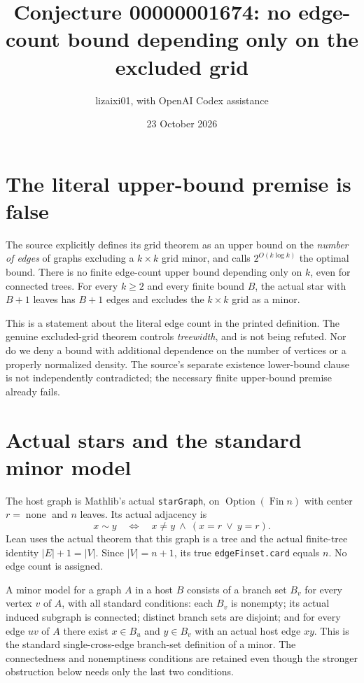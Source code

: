 \documentclass[11pt]{article}
\title{Conjecture 00000001674: no edge-count bound depending only on the excluded grid}
\author{lizaixi01, with OpenAI Codex assistance}
\date{23 October 2026}
\begin{document}
\maketitle
\section{The literal upper-bound premise is false}
The source explicitly defines its grid theorem as an upper bound
on the \emph{number of edges} of graphs excluding a $k\times k$
grid minor, and calls $2^{O(k\log k)}$ the optimal bound.
There is no finite edge-count upper bound depending only on $k$,
even for connected trees. For every $k\geq2$ and every finite
bound $B$, the actual star with $B+1$ leaves has $B+1$ edges
and excludes the $k\times k$ grid as a minor.

This is a statement about the literal edge count in the printed
definition. The genuine excluded-grid theorem controls
\emph{treewidth}, and is not being refuted. Nor do we deny a
bound with additional dependence on the number of vertices or a
properly normalized density. The source's separate existence
lower-bound clause is not independently contradicted; the
necessary finite upper-bound premise already fails.

\section{Actual stars and the standard minor model}
The host graph is Mathlib's actual \texttt{starGraph}, on
$\operatorname{Option}(\operatorname{Fin}n)$ with center
$r=\operatorname{none}$ and $n$ leaves. Its actual adjacency is
\[
 x\sim y\quad\Longleftrightarrow\quad
 x\ne y\ \land\ (x=r\ \lor\ y=r).
\]
Lean uses the actual theorem that this graph is a tree and the
actual finite-tree identity
$|E|+1=|V|$. Since $|V|=n+1$, its true
\texttt{edgeFinset.card} equals $n$. No edge count is assigned.

A minor model for a graph $A$ in a host $B$ consists of a branch
set $B_v$ for every vertex $v$ of $A$, with all standard conditions:
each $B_v$ is nonempty; its actual induced subgraph is connected;
distinct branch sets are disjoint; and for every edge $uv$ of $A$
there exist $x\in B_u$ and $y\in B_v$ with an actual host edge
$xy$. This is the standard single-cross-edge branch-set
definition of a minor. The connectedness and nonemptiness
conditions are retained even though the stronger obstruction
below needs only the last two conditions.
\end{document}
